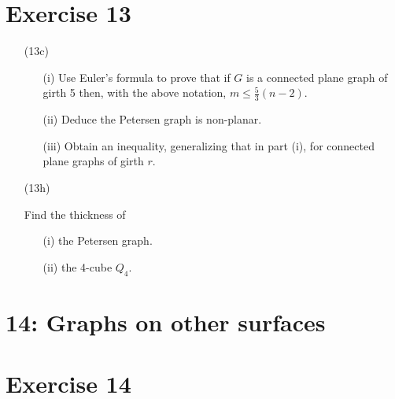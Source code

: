 \documentclass[12pt,a4paper, twocolumn]{article}
\begin{document}
\section*{Exercise 13}
\begin{itemize}
	\item[(13c)] {\color{blue}
			\begin{itemize}
				\item[(i)] Use Euler's formula to prove that if $G$ is a connected plane graph of girth 5 then, with the above notation, $m \leq \frac{5}{3} (n-2)$.
				\item[(ii)] Deduce the Petersen graph is non-planar.
				\item[(iii)] Obtain an inequality, generalizing that in part (i), for connected plane graphs of girth $r$.
			\end{itemize}
	}
	\item[(13h)] {\color{blue} Find the thickness of
			\begin{itemize}
				\item[(i)] the Petersen graph.
				\item[(ii)] the 4-cube $Q_4$.
			\end{itemize}
			}
\end{itemize}

\section*{14: Graphs on other surfaces}

\section*{Exercise 14}
\end{document}
